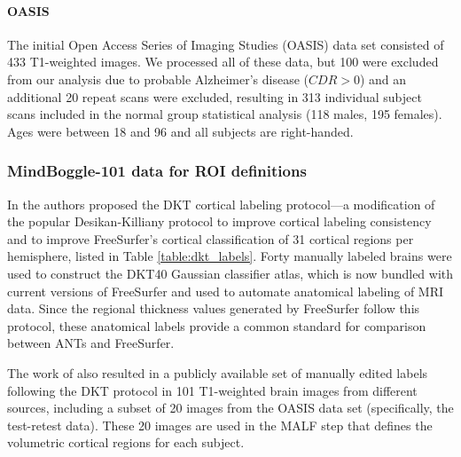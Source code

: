 \paragraph{OASIS}
The initial Open Access Series of Imaging Studies (OASIS)
data set consisted of 433 T1-weighted images.  We processed all of these data,
but 100 were excluded from our analysis due to probable Alzheimer's
disease ($CDR > 0$) and an additional 20 repeat scans were excluded,
 resulting in 313 individual subject scans included in the normal group statistical
analysis (118 males, 195 females).  Ages were between 18 and 96 and 
all subjects are right-handed.  


\subsubsection{MindBoggle-101 data for ROI definitions}

In \cite{klein2012} the authors proposed the DKT cortical labeling protocol---a modification of the
popular Desikan-Killiany protocol \citep{desikan2006} to improve cortical labeling
consistency and to improve FreeSurfer's cortical classification of 31 cortical regions per hemisphere,
listed in Table \ref{table:dkt_labels}.
Forty manually labeled brains were used to construct the DKT40 Gaussian classifier atlas,
which is now bundled with current versions of FreeSurfer and
used to automate anatomical labeling of MRI data.
Since the regional thickness values generated by FreeSurfer follow this protocol,
these anatomical labels provide a common standard for comparison between ANTs and FreeSurfer.

The work of \cite{klein2012} also resulted in a publicly available set of
manually edited labels following the DKT protocol in 101
T1-weighted  brain images from different sources, including a subset of 20 images
from the OASIS data set (specifically, the test-retest data).  
These 20 images are used in the MALF step that defines the volumetric cortical regions 
for each subject.  

